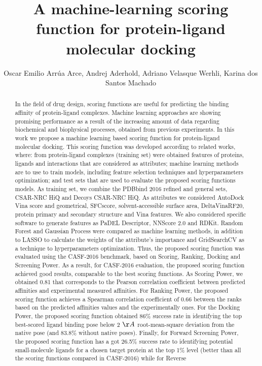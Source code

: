 \documentclass[twoside]{article}
\title{\vspace{-15mm}\fontsize{24pt}{10pt}\selectfont\textbf{ A machine-learning scoring function for protein-ligand molecular docking }} %
\author{ Oscar Emilio Arr\'ua Arce,  Andrej Aderhold,  Adriano Velasque Werhli,  Karina dos Santos Machado }
\affil{ Universidade Federal do Rio Grande - FURG,  UNIVERSIDADE FEDERAL DO RIO GRANDE }
\date{}
\begin{document}
  
  
  \maketitle %
  
  
  \thispagestyle{fancy} %
  
  
  \begin{abstract}
  In the field of drug design,  scoring functions are useful for predicting the binding affinity of protein-ligand complexes. Machine learning approaches are showing promising performance as a result of the increasing amount of data regarding biochemical and biophysical processes,  obtained from previous experiments. In this work we propose a machine learning based scoring function for protein-ligand molecular docking. This scoring function was developed according to related works,  where: from protein-ligand complexes (training set) were obtained features of proteins,  ligands and  interactions that are considered as attributes; machine learning methods are to use to train models,  including feature selection techniques and hyperparameters optimization; and test sets that are used to evaluate the proposed scoring functions models. As training set,  we combine the PDBbind 2016 refined and general sets,  CSAR-NRC HiQ and Decoys CSAR-NRC HiQ. As attributes we considered AutoDock Vina score and geometrical,  SFCscore,  solvent-accessible surface area,  DeltaVinaRF20,  protein primary and secondary structure and Vina features. We also considered specific software to generate features as PaDEL Descriptor,  NNScore 2.0 and RDKit. Random Forest and Gaussian Process were compared as machine learning methods,  in addition to LASSO to calculate the weights of the attribute’s importance and GridSearchCV as a technique to hyperparameters optimization. Thus,  the proposed scoring function was evaluated using the CASF-2016 benchmark,  based on Scoring,  Ranking,  Docking and Screening Power. As a result,  for CASF-2016 evaluation,  the proposed scoring function achieved good results,  comparable to the best scoring functions. As Scoring Power,  we obtained 0.81 that corresponds to the Pearson correlation coefficient between predicted affinities and experimental measured affinities. For Ranking Power,  the proposed scoring function achieves a Spearman correlation coefficient of 0.66 between the ranks based on the predicted affinities values and the experimentally ones. For the Docking Power,  the proposed scoring function obtained 86\% success rate in identifying the top best-scored ligand binding pose below 2 $\AA$ root-mean-square deviation from the native pose (and 83.8\% without native poses). Finally,  for Forward Screening Power,  the proposed  scoring function has a got 26.5\% success rate to identifying potential small-molecule ligands for a chosen target protein at the top 1\% level (better than all the scoring functions compared in CASF-2016) while for Reverse 
\end{abstract}
\end{document}
